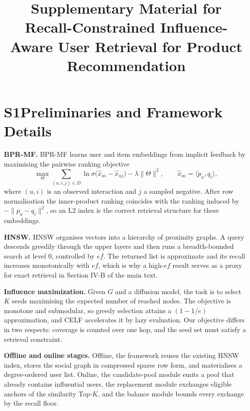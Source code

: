 \documentclass[conference]{IEEEtran}
\begin{document}
\title{Supplementary Material for\\Recall-Constrained Influence-Aware User Retrieval for Product Recommendation}
\maketitle

\section*{S1\quad Preliminaries and Framework Details}
\label{sec:s1}

\textbf{BPR-MF.} BPR-MF learns user and item embeddings from implicit feedback
by maximising the pairwise ranking objective
\begin{equation}
\max_{\Theta}\sum_{(u,i,j)\in D}\ln\sigma\big(\hat{x}_{ui}-\hat{x}_{uj}\big)-\lambda\|\Theta\|^2,
\qquad \hat{x}_{ui}=\langle p_u,q_i\rangle,
\end{equation}
where $(u,i)$ is an observed interaction and $j$ a sampled negative. After row
normalisation the inner-product ranking coincides with the ranking induced by
$-\|p_u-q_i\|^2$, so an L2 index is the correct retrieval structure for these
embeddings.

\textbf{HNSW.} HNSW organises vectors into a hierarchy
of proximity graphs. A query descends greedily through the upper layers and then
runs a breadth-bounded search at level $0$, controlled by $\mathit{ef}$. The
returned list is approximate and its recall increases monotonically with
$\mathit{ef}$, which is why a high-$\mathit{ef}$ result serves as a proxy for
exact retrieval in Section IV-B of the main text.

\textbf{Influence maximization.} Given $G$ and a diffusion model, the task is to
select $K$ seeds maximising the expected number of reached nodes. The objective
is monotone and submodular, so greedy selection attains a $(1-1/e)$
approximation, and CELF accelerates it by lazy evaluation.
Our objective differs in two respects: coverage is counted over one hop, and the
seed set must satisfy a retrieval constraint.

\textbf{Offline and online stages.} Offline, the framework reuses the existing
HNSW index, stores the social graph in compressed sparse row form, and
materialises a degree-ordered user list. Online, the candidate-pool module emits
a pool that already contains influential users, the replacement module exchanges
eligible anchors of the similarity Top-$K$, and the balance module bounds every
exchange by the recall floor.
\end{document}
